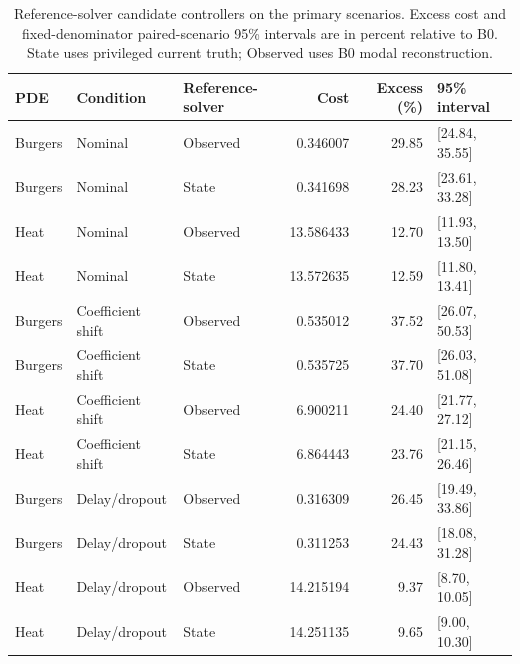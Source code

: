 \begin{table}[ht]
\caption{Reference-solver candidate controllers on the primary scenarios. Excess cost and fixed-denominator paired-scenario 95\% intervals are in percent relative to B0. State uses privileged current truth; Observed uses B0 modal reconstruction.}\label{tab:revision_oracles}
\centering\small
\begin{tabular}{@{}lllrrl@{}}\toprule
PDE & Condition & Reference-solver & Cost & Excess (\%) & 95\% interval\\\midrule
Burgers & Nominal & Observed & 0.346007 & 29.85 & [24.84, 35.55] \\
Burgers & Nominal & State & 0.341698 & 28.23 & [23.61, 33.28] \\
Heat & Nominal & Observed & 13.586433 & 12.70 & [11.93, 13.50] \\
Heat & Nominal & State & 13.572635 & 12.59 & [11.80, 13.41] \\
Burgers & Coefficient shift & Observed & 0.535012 & 37.52 & [26.07, 50.53] \\
Burgers & Coefficient shift & State & 0.535725 & 37.70 & [26.03, 51.08] \\
Heat & Coefficient shift & Observed & 6.900211 & 24.40 & [21.77, 27.12] \\
Heat & Coefficient shift & State & 6.864443 & 23.76 & [21.15, 26.46] \\
Burgers & Delay/dropout & Observed & 0.316309 & 26.45 & [19.49, 33.86] \\
Burgers & Delay/dropout & State & 0.311253 & 24.43 & [18.08, 31.28] \\
Heat & Delay/dropout & Observed & 14.215194 & 9.37 & [8.70, 10.05] \\
Heat & Delay/dropout & State & 14.251135 & 9.65 & [9.00, 10.30] \\
\bottomrule\end{tabular}
\end{table}

